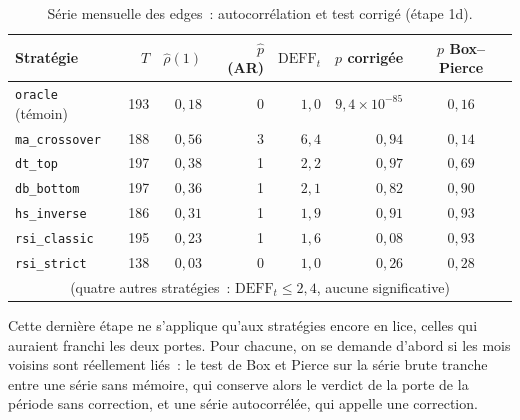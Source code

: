 \begin{table}[H]
\centering
\caption{Série mensuelle des edges~: autocorrélation et test corrigé (étape 1d).}
\label{tab:b1-dep-mensuel}
\small
\begin{tabular}{@{}lrrrrrc@{}}
\toprule
Stratégie & $T$ & $\hat\rho(1)$ & $\hat p$ (AR) & $\mathrm{DEFF}_t$ & $p$ corrigée & $p$ Box--Pierce \\
\midrule
\texttt{oracle} (témoin) & 193 & $0{,}18$ & 0 & $1{,}0$ & $9{,}4\times10^{-85}$ & $0{,}16$ \\
\midrule
\texttt{ma\_crossover} & 188 & $0{,}56$ & 3 & $6{,}4$ & $0{,}94$ & $0{,}14$ \\
\texttt{dt\_top}       & 197 & $0{,}38$ & 1 & $2{,}2$ & $0{,}97$ & $0{,}69$ \\
\texttt{db\_bottom}    & 197 & $0{,}36$ & 1 & $2{,}1$ & $0{,}82$ & $0{,}90$ \\
\texttt{hs\_inverse}   & 186 & $0{,}31$ & 1 & $1{,}9$ & $0{,}91$ & $0{,}93$ \\
\texttt{rsi\_classic}  & 195 & $0{,}23$ & 1 & $1{,}6$ & $0{,}08$ & $0{,}93$ \\
\texttt{rsi\_strict}   & 138 & $0{,}03$ & 0 & $1{,}0$ & $0{,}26$ & $0{,}28$ \\
\multicolumn{7}{c}{\footnotesize (quatre autres stratégies~: $\mathrm{DEFF}_t \le 2{,}4$, aucune significative)} \\
\bottomrule
\end{tabular}
\end{table}



Cette dernière étape ne s'applique qu'aux stratégies encore en lice, celles
qui auraient franchi les deux portes. Pour chacune, on se demande d'abord si
les mois voisins sont réellement liés~: le test de Box et Pierce sur la série
brute tranche entre une série sans mémoire, qui conserve alors le verdict de
la porte de la période sans correction, et une série autocorrélée, qui appelle
une correction.

